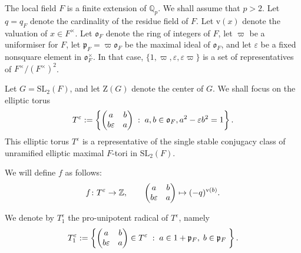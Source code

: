\documentclass[11pt]{amsart}
\numberwithin{equation}{section}
\def\fo{\mathfrak{o}}
\def\fp{\mathfrak{p}}
\def\rZ{\mathrm{Z}}
\def\val{\mathrm{v}}
\def\Z{\mathbb{Z}}
\def\Qp{\mathbb{Q}_p}
\def\SL{\mathrm{SL}}
\def\fo{\mathfrak{o}}
\def\fp{\mathfrak{p}}
\newcommand{\<}{\left\langle}
\renewcommand{\>}{\right\rangle}
\begin{document}

The local field $F$ is a finite extension of $\Qp$.    We shall assume that $p > 2$. 
Let $q = q_F$ denote the cardinality of the residue field of $F$. Let $\val(x)$ denote the valuation of $x \in F^\times$.  Let $\fo_F$ denote the ring of integers of $F$,  let $\varpi$ be a uniformiser for $F$,  let $\fp_F=\varpi\fo_F$ be the maximal ideal of $\fo_F$, and let  $\varepsilon$ be a fixed nonsquare element in $\fo_F^\times$.  In that case, $\{1,\varpi,\varepsilon,\varepsilon\varpi\}$  is a set of representatives of $F^\times/(F^\times)^2$. 

Let $G = \SL_2(F)$, and let $\rZ(G)$ denote the center of $G$.  We shall focus on the elliptic torus
\begin{equation} \label{eqn:tori}
T^\varepsilon:=
\left\{\left(
\begin{matrix}
a&b\cr
b\varepsilon&a
\end{matrix}\right)\;:\; a,b\in\fo_F, a^2-\varepsilon b^2=1
\right\}.
\end{equation}
This elliptic torus $T^\varepsilon$ is a representative of the single stable conjugacy class of unramified elliptic maximal $F$-tori in $\SL_2(F)$.   

We will define $f$ as follows:
\begin{equation} \label{eqn:definition-of-f}
f \colon T^\varepsilon \to \Z, \quad \quad 
\left(
\begin{matrix}
a&b\cr
b\varepsilon&a
\end{matrix}\right) \mapsto (-q)^{\val(b)} .
\end{equation}

We denote by $T^{\varepsilon}_1$ the pro-unipotent radical of $T^\varepsilon$, namely
\begin{equation} \label{T_1}
T^\varepsilon_1:=
\left\{\left(
\begin{matrix}
a&b\cr
b\varepsilon &a
\end{matrix}\right) \in T^\varepsilon \;:\; a \in 1 + \fp_F,\; b \in \fp_F \; \right\}.
\end{equation}
\end{document}
